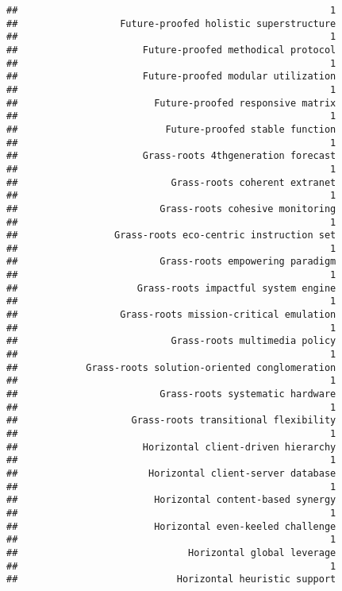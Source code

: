 \documentclass[
]{article}
\begin{document}
\begin{verbatim}
##                                                       1 
##                  Future-proofed holistic superstructure 
##                                                       1 
##                      Future-proofed methodical protocol 
##                                                       1 
##                      Future-proofed modular utilization 
##                                                       1 
##                        Future-proofed responsive matrix 
##                                                       1 
##                          Future-proofed stable function 
##                                                       1 
##                      Grass-roots 4thgeneration forecast 
##                                                       1 
##                           Grass-roots coherent extranet 
##                                                       1 
##                         Grass-roots cohesive monitoring 
##                                                       1 
##                 Grass-roots eco-centric instruction set 
##                                                       1 
##                         Grass-roots empowering paradigm 
##                                                       1 
##                     Grass-roots impactful system engine 
##                                                       1 
##                  Grass-roots mission-critical emulation 
##                                                       1 
##                           Grass-roots multimedia policy 
##                                                       1 
##            Grass-roots solution-oriented conglomeration 
##                                                       1 
##                         Grass-roots systematic hardware 
##                                                       1 
##                    Grass-roots transitional flexibility 
##                                                       1 
##                      Horizontal client-driven hierarchy 
##                                                       1 
##                       Horizontal client-server database 
##                                                       1 
##                        Horizontal content-based synergy 
##                                                       1 
##                        Horizontal even-keeled challenge 
##                                                       1 
##                              Horizontal global leverage 
##                                                       1 
##                            Horizontal heuristic support 

\end{verbatim}
\end{document}
